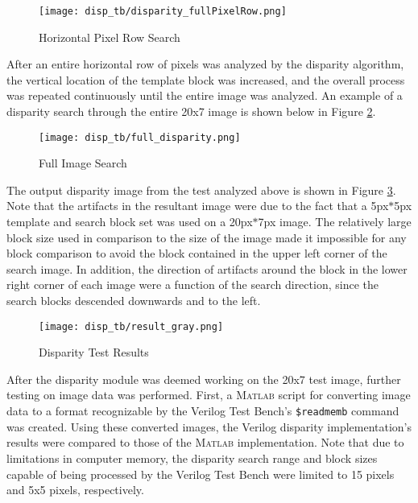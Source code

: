 \par
\begin{figure}[H]
	\centerline{\texttt{[image: disp\_tb/disparity\_fullPixelRow.png]}}
	\caption{Horizontal Pixel Row Search}
	\label{disparityHorizSearch}
\end{figure}
\par
After an entire horizontal row of pixels was analyzed by the disparity algorithm, the vertical location of the template block was increased, and the overall process was repeated continuously until the entire image was analyzed. An example of a disparity search through the entire 20x7 image is shown below in Figure \ref{disparityFullSearch}.
\par
\begin{figure}[H]
	\centerline{\texttt{[image: disp\_tb/full\_disparity.png]}}
	\caption{Full Image Search}
	\label{disparityFullSearch}
\end{figure}
\par
The output disparity image from the test analyzed above is shown in Figure \ref{disparityTestResults}. Note that the artifacts in the resultant image were due to the fact that a 5px$*$5px template and search block set was used on a 20px$*$7px image. The relatively large block size used in comparison to the size of the image made it impossible for any block comparison to avoid the block contained in the upper left corner of the search image. In addition, the direction of artifacts around the block in the lower right corner of each image were a function of the search direction, since the search blocks descended downwards and to the left.
\par
\begin{figure}[H]
	\centerline{\texttt{[image: disp\_tb/result\_gray.png]}}
	\caption{Disparity Test Results}
	\label{disparityTestResults}
\end{figure}
\par
After the disparity module was deemed working on the 20x7 test image, further testing on image data was performed. First, a \textsc{Matlab} script for converting image data to a format recognizable by the Verilog Test Bench's \texttt{\$readmemb} command was created. Using these converted images, the Verilog disparity implementation's results were compared to those of the \textsc{Matlab} implementation. Note that due to limitations in computer memory, the disparity search range and block sizes capable of being processed by the Verilog Test Bench were limited to 15 pixels and 5x5 pixels, respectively. 
